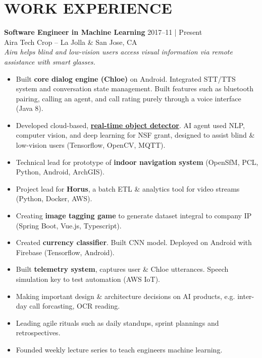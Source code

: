 \documentclass[line,mm]{res}
\begin{document}
\section{WORK EXPERIENCE} 
{\bf Software Engineer in Machine Learning } \hfill 2017--11 | Present \\
  Aira Tech Crop -- La Jolla \& San Jose, CA \\
  \textit{ Aira helps blind and low-vision users access visual information via remote assistance with smart glasses. }
  \begin{itemize}  \itemsep -2pt %
    \item Built {\bf core dialog engine (Chloe)} on Android. Integrated STT/TTS system and conversation state management. Built features such as bluetooth pairing, calling an agent, and call rating purely through a voice interface (Java 8). 
    \item Developed cloud-based, \href{https://github.com/aira/object_detector}{{\bf real-time object detector}}.  AI agent used NLP, computer vision, and deep learning for NSF grant, designed to assist blind \& low-vision users (Tensorflow, OpenCV, MQTT).
    \item Technical lead for prototype of {\bf indoor navigation system} (OpenSfM, PCL, Python, Android, ArchGIS). 
    \item Project lead for {\bf Horus}, a batch ETL \& analytics tool for video streams (Python, Docker, AWS).
    \item Creating {\bf image tagging game} to generate dataset integral to company IP (Spring Boot, Vue.js, Typescript).
    \item Created {\bf currency classifier}. Built CNN model. Deployed on Android with Firebase (Tensorflow, Android).
    \item Built {\bf telemetry system}, captures user \& Chloe utterances. Speech simulation key to test automation (AWS IoT).
    \item Making important design \& architecture decisions on AI products, e.g. inter-day call forcasting, OCR reading.
    \item Leading agile rituals such as daily standups, sprint plannings and retrospectives.
    \item Founded weekly lecture series to teach engineers machine learning. 
  \end{itemize} 
\end{document}
